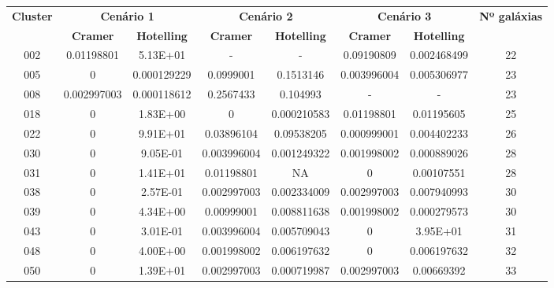 {\scriptsize
\begin{longtable}{cccccccc}
\hline
\multirow{2}{*}{\textbf{Cluster}} & \multicolumn{2}{|c|}{\textbf{Cenário 1}} & \multicolumn{2}{c|}{\textbf{Cenário 2}} & \multicolumn{2}{c|}{\textbf{Cenário 3}} & \multirow{2}{*}{\textbf{Nº galáxias}} \\ \cline{2-7}
                         & \multicolumn{1}{|c}{\textbf{Cramer}}       & \textbf{Hotelling}       & \textbf{Cramer}       & \textbf{Hotelling}       & \textbf{Cramer}       & \textbf{Hotelling}       &                              \\ \hline
002 & {\color{red}0.01198801} & 5.13E+01 & - & - & 0.09190809 & {\color{red}0.002468499} & 22 \\
005 & {\color{red}0} & {\color{red}0.000129229} & 0.0999001 & 0.1513146 & {\color{red}0.003996004} & {\color{red}0.005306977} & 23 \\
008 & {\color{red}0.002997003} & {\color{red}0.000118612} & 0.2567433 & 0.104993 & - & - & 23 \\
018 & {\color{red}0} & 1.83E+00 & {\color{red}0} & {\color{red}0.000210583} & {\color{red}0.01198801} & {\color{red}0.01195605} & 25 \\
022 & {\color{red}0} & 9.91E+01 & {\color{red}0.03896104} & 0.09538205 & {\color{red}0.000999001} & {\color{red}0.004402233} & 26 \\
030 & {\color{red}0} & 9.05E-01 & {\color{red}0.003996004} & {\color{red}0.001249322} & {\color{red}0.001998002} & {\color{red}0.000889026} & 28 \\
031 & {\color{red}0} & 1.41E+01 & {\color{red}0.01198801} & NA & {\color{red}0} & {\color{red}0.00107551} & 28 \\
038 & {\color{red}0} & 2.57E-01 & {\color{red}0.002997003} & {\color{red}0.002334009} & {\color{red}0.002997003} & {\color{red}0.007940993} & 30 \\
039 & {\color{red}0} & 4.34E+00 & {\color{red}0.00999001} & {\color{red}0.008811638} & {\color{red}0.001998002} & {\color{red}0.000279573} & 30 \\
043 & {\color{red}0} & 3.01E-01 & {\color{red}0.003996004} & {\color{red}0.005709043} & {\color{red}0} & 3.95E+01 & 31 \\
048 & {\color{red}0} & 4.00E+00 & {\color{red}0.001998002} & {\color{red}0.006197632} & {\color{red}0} & {\color{red}0.006197632} & 32 \\
050 & {\color{red}0} & 1.39E+01 & {\color{red}0.002997003} & {\color{red}0.000719987} & {\color{red}0.002997003} & {\color{red}0.00669392} & 33 \\

\end{longtable}}
